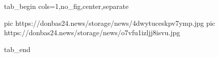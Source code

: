  
 
 
 
 

\ifcmt
  tab_begin cols=1,no_fig,center,separate

     pic https://donbas24.news/storage/news/4dwytuceskpv7ymp.jpg
		 pic https://donbas24.news/storage/news/o7vfu1izljj8isvu.jpg

  tab_end
\fi
